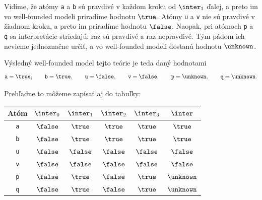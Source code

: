 Vidíme, že atómy \verb|a| a \verb|b| sú pravdivé v každom kroku od $\inter_1$ ďalej, a preto im vo
well-founded modeli priradíme hodnotu $\true$. Atómy \verb|u| a \verb|v| nie sú pravdivé v žiadnom
kroku, a preto im priradíme hodnotu $\false$. Naopak, pri atómoch \verb|p| a \verb|q| sa interpretácie
striedajú: raz sú pravdivé a raz nepravdivé. Tým pádom ich nevieme jednoznačne určiť, a vo
well-founded modeli dostanú hodnotu $\unknown$.

Výsledný well-founded model tejto teórie je teda daný hodnotami
$$\verb|a| = \true, \qquad \verb|b| = \true, \qquad \verb|u| = \false, \qquad \verb|v| = \false, \qquad \verb|p| = \unknown, \qquad \verb|q| = \unknown\text{.}$$

Prehľadne to môžeme zapísať aj do tabuľky:

\begin{center}
\begin{tabular}{c|c|c|c|c|c}
Atóm & $\inter_0$ & $\inter_1$ & $\inter_2$ & $\inter_3$ & $\inter$ \\
\hline
\verb|a| & $\false$ & $\true$ & $\true$ & $\true$ & $\true$ \\
\verb|b| & $\false$ & $\true$ & $\true$ & $\true$ & $\true$ \\
\verb|u| & $\false$ & $\false$ & $\false$ & $\false$ & $\false$ \\
\verb|v| & $\false$ & $\false$ & $\false$ & $\false$ & $\false$ \\
\verb|p| & $\false$ & $\true$ & $\false$ & $\true$ & $\unknown$ \\
\verb|q| & $\false$ & $\true$ & $\false$ & $\true$ & $\unknown$ \\
\end{tabular}
\end{center}

